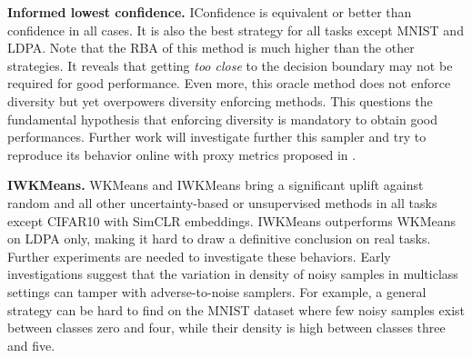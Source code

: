 \documentclass[runningheads]{llncs}
\def\bf{\bfseries}
\begin{document}








\textbf{Informed lowest confidence.}
IConfidence is equivalent or better than confidence in all cases. It is also the best strategy for all tasks except MNIST and LDPA. Note that
the RBA of this method is much higher than the other strategies. It reveals that getting \emph{too close} to the decision boundary may not be required for good performance. Even more, this oracle method does not enforce diversity but yet overpowers diversity enforcing methods. This questions the fundamental hypothesis that enforcing diversity is mandatory to obtain good performances.
Further work will investigate further this sampler and try to reproduce its behavior online with proxy metrics proposed in \cite{abraham2020rebuilding}.

\textbf{IWKMeans.} WKMeans and IWKMeans bring a significant uplift against random and all other uncertainty-based or unsupervised methods in all tasks except
CIFAR10 with SimCLR embeddings. IWKMeans outperforms WKMeans on LDPA only, making it hard to draw a definitive conclusion on real tasks.
Further experiments are needed to investigate these behaviors. Early investigations suggest that the variation in density of noisy samples in
multiclass settings can tamper with adverse-to-noise samplers. For example, a general strategy can be hard to find on the MNIST dataset where few noisy samples
exist between classes zero and four, while their density is high between classes three and five.
\end{document}
